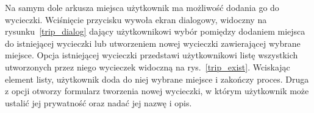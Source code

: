         Na samym dole arkusza miejsca użytkownik ma możliwość dodania go do wycieczki. Wciśnięcie przycisku wywoła ekran dialogowy, widoczny na rysunku~\ref{trip_dialog} 
        dający użytkownikowi wybór pomiędzy dodaniem miejsca do istniejącej wycieczki lub utworzeniem nowej wycieczki zawierającej wybrane miejsce. Opcja istniejącej wycieczki
        przedstawi użytkownikowi listę wszystkich utworzonych przez niego wycieczek widoczną na rys.~\ref{trip_exist}. Wciskając element listy, użytkownik doda do niej wybrane miejsce 
        i zakończy proces. Druga z opcji otworzy formularz tworzenia nowej wycieczki, w którym użytkownik może ustalić jej prywatność oraz nadać jej nazwę i opis.

        \vspace{1cm}
        \begin{figure}[H]
            \centering
            \begin{subfigure}[b]{0.3\textwidth}
                \centering

\end{subfigure}
\end{figure}
